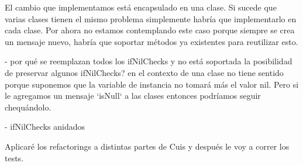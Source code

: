 

El cambio que implementamos está encapsulado en una clase. Si sucede que varias clases tienen el mismo
problema simplemente habría que implementarlo en cada clase. Por ahora no estamos contemplando este caso
porque siempre se crea un mensaje nuevo, habría que soportar métodos ya existentes para reutilizar esto.











- por qué se reemplazan todos los ifNilChecks y no está soportada la posibilidad de preservar algunos ifNilChecks? 
en el contexto de una clase no tiene sentido porque suponemos que la variable de instancia no
tomará más el valor nil. Pero si le agregamos un mensaje `isNull` a las clases entonces
podríamos seguir chequándolo. 

- ifNilChecks anidados

Aplicaré los refactorings a distintas partes de Cuis y después le voy a correr los tests.